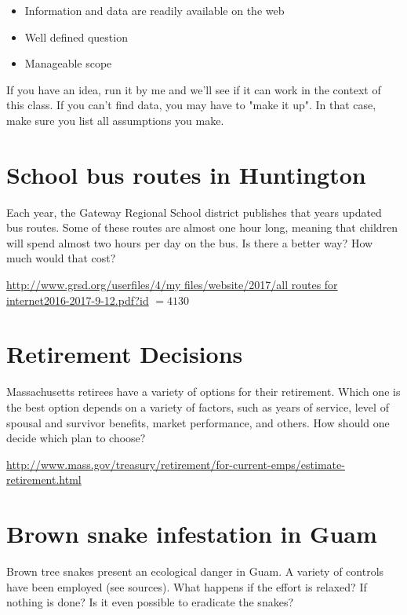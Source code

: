 \documentclass[10pt]{article}
\begin{document}
\begin{itemize}
  \item Information and data are readily available on the web

  \item Well defined question

  \item Manageable scope

\end{itemize}
If you have an idea, run it by me and we'll see if it can work in the context of this class. If you can't find data, you may have to "make it up". In that case, make sure you list all assumptions you make.

\section{School bus routes in Huntington}
Each year, the Gateway Regional School district publishes that years updated bus routes. Some of these routes are almost one hour long, meaning that children will spend almost two hours per day on the bus. Is there a better way? How much would that cost?

\href{http://www.grsd.org/userfiles/4/my%20files/website/2017/all%20routes%20for%20internet2016-2017-9-12.pdf?id}{http://www.grsd.org/userfiles/4/my files/website/2017/all routes for internet2016-2017-9-12.pdf?id} $=4130$

\section{Retirement Decisions}
Massachusetts retirees have a variety of options for their retirement. Which one is the best option depends on a variety of factors, such as years of service, level of spousal and survivor benefits, market performance, and others. How should one decide which plan to choose?

\href{http://www.mass.gov/treasury/retirement/for-current-emps/estimate-retirement.html}{http://www.mass.gov/treasury/retirement/for-current-emps/estimate-retirement.html}

\section{Brown snake infestation in Guam}
Brown tree snakes present an ecological danger in Guam. A variety of controls have been employed (see sources). What happens if the effort is relaxed? If nothing is done? Is it even possible to eradicate the snakes?
\end{document}
